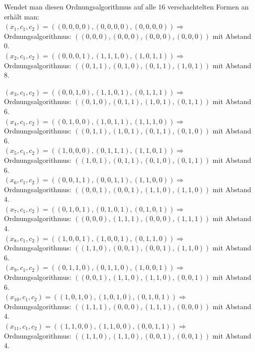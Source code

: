 \begin{Beispiel}
    Wendet man diesen Ordnungsalgorithmus auf alle $16$ verschachtelten Formen an erhält man:\\
    
    
    $(x_{1}, c_1, c_2) = ((0,0,0,0), (0,0,0,0), (0,0,0,0)) \Rightarrow$ Ordnungsalgorithmus: $((0,0,0),(0, 0,0),(0,0, 0),(0,0,0))$ mit Abstand $0$.\\
    
    $(x_{2}, c_1, c_2) = ((0,0,0,1), (1,1,1,0), (1,0,1,1)) \Rightarrow$ Ordnungsalgorithmus: $((0,1,1),(0, 1,0),(0,1, 1),(1,0,1))$ mit Abstand $8$.\\
    \pagebreak
    
    $(x_{3}, c_1, c_2) = ((0,0,1,0), (1,1,0,1), (0,1,1,1)) \Rightarrow$ Ordnungsalgorithmus: $((0,1,0),(0, 1,1),(1,0, 1),(0,1,1))$ mit Abstand $6$.\\
    
    $(x_{4}, c_1, c_2) = ((0,1,0,0), (1,0,1,1), (1,1,1,0)) \Rightarrow$ Ordnungsalgorithmus: $((0,1,1),(1, 0,1),(0,1, 1),(0,1,0))$ mit Abstand $6$.\\
    
    $(x_{5}, c_1, c_2) = ((1,0,0,0), (0,1,1,1), (1,1,0,1)) \Rightarrow$ Ordnungsalgorithmus: $((1,0,1),(0, 1,1),(0,1, 0),(0,1,1))$ mit Abstand $6$.\\
    
    $(x_{6}, c_1, c_2) = ((0,0,1,1), (0,0,1,1), (1,1,0,0)) \Rightarrow$ Ordnungsalgorithmus: $((0,0,1),(0, 0,1),(1,1, 0),(1,1,0))$ mit Abstand $4$.\\
    
    $(x_{7}, c_1, c_2) = ((0,1,0,1), (0,1,0,1), (0,1,0,1)) \Rightarrow$ Ordnungsalgorithmus: $((0,0,0),(1, 1,1),(0,0, 0),(1,1,1))$ mit Abstand $4$.\\
    
    $(x_{8}, c_1, c_2) = ((1,0,0,1), (1,0,0,1), (0,1,1,0)) \Rightarrow$ Ordnungsalgorithmus: $((1,1,0),(0, 0,1),(0,0, 1),(1,1,0))$ mit Abstand $6$.\\
    
    $(x_{9}, c_1, c_2) = ((0,1,1,0), (0,1,1,0), (1,0,0,1)) \Rightarrow$ Ordnungsalgorithmus: $((0,0,1),(1, 1,0),(1,1, 0),(0,0,1))$ mit Abstand $6$.\\
    
    $(x_{10}, c_1, c_2) = ((1,0,1,0), (1,0,1,0), (0,1,0,1)) \Rightarrow$ Ordnungsalgorithmus: $((1,1,1),(0, 0,0),(1,1, 1),(0,0,0))$ mit Abstand $4$.\\
    
    $(x_{11}, c_1, c_2) = ((1,1,0,0), (1,1,0,0), (0,0,1,1)) \Rightarrow$ Ordnungsalgorithmus: $((1,1,0),(1, 1,0),(0,0, 1),(0,0,1))$ mit Abstand $4$.\\
    

\end{Beispiel}
